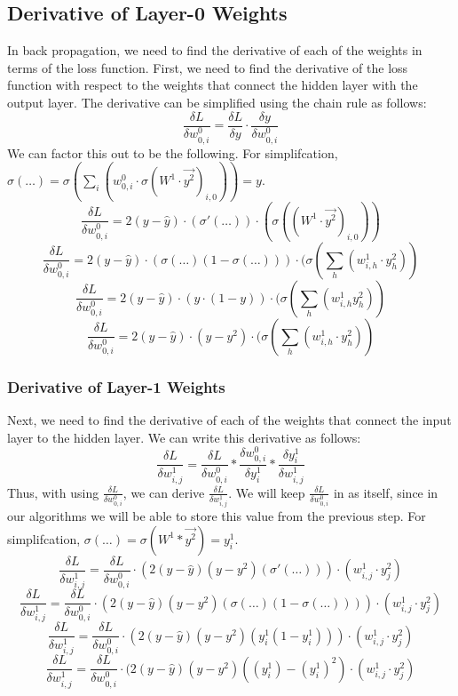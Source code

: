 \documentclass[10pt]{article}
\begin{document}
\subsection{Derivative of Layer-0 Weights}
In back propagation, we need to find the derivative of each of the weights in terms of the loss function. First, we need to find the derivative of the loss function with respect to the weights that connect the hidden layer with the output layer. The derivative can be simplified using the chain rule as follows:
$$\frac{\delta L}{\delta w^0_{0,i}} = \frac{\delta L}{\delta y} \cdot \frac{\delta y}{\delta w^0_{0,i}}$$
We can factor this out to be the following. 
\newline
For simplifcation, $\sigma(\ldots) = \sigma(\sum_i{(w^0_{0,i} \cdot \sigma(W^1 \cdot \vec{y^2})_{i,0})}) = y$.
$$\frac{\delta L}{\delta w^0_{0,i}} = 2(y - \hat{y}) \cdot (\sigma'(\ldots)) \cdot (\sigma((W^1 \cdot \vec{y^2})_{i,0}))$$
$$\frac{\delta L}{\delta w^0_{0,i}} = 2(y - \hat{y}) \cdot (\sigma(\ldots)(1 - \sigma(\ldots))) \cdot (\sigma(\sum_h{(w^1_{i,h} \cdot y^2_{h})})$$
$$\frac{\delta L}{\delta w^0_{0,i}} = 2(y - \hat{y}) \cdot (y \cdot (1 - y)) \cdot (\sigma(\sum_h{(w^1_{i,h} y^2_{h})})$$
$$\frac{\delta L}{\delta w^0_{0,i}} = 2(y - \hat{y}) \cdot (y - y^2) \cdot  (\sigma(\sum_h^{}{(w^1_{i,h} \cdot y^2_{h})})$$

\subsubsection{Derivative of Layer-1 Weights}
Next, we need to find the derivative of each of the weights that connect the input layer to the hidden layer. We can write this derivative as follows:
$$\frac{\delta L}{\delta w^1_{i,j}} = \frac{\delta L}{\delta w^0_{0,i}} * \frac{\delta w^0_{0,i}}{\delta y^1_i} * \frac{\delta y^1_i}{\delta w^1_{i,j}}$$
Thus, with using $\frac{\delta L}{\delta w^0_{0,i}}$, we can derive $\frac{\delta L}{\delta w^1_{i,j}}$. We will keep $\frac{\delta L}{\delta w^0_{0,i}}$ in as itself, since in our algorithms we will be able to store this value from the previous step.
\newline
For simplifcation, $\sigma(\ldots) = \sigma(W^1 * \vec{y^2}) = y^1_i$.
$$\frac{\delta L}{\delta w^1_{i,j}} = \frac{\delta L}{\delta w^0_{0,i}} \cdot (2(y-\hat{y})(y - y^2)(\sigma'(\ldots))) \cdot (w^1_{i,j} \cdot y^2_{j})$$
$$\frac{\delta L}{\delta w^1_{i,j}} = \frac{\delta L}{\delta w^0_{0,i} } \cdot (2(y - \hat{y})(y - y^2)(\sigma(\ldots)(1 - \sigma(\ldots)))) \cdot (w^1_{i,j} \cdot y^2_{j})$$
$$\frac{\delta L}{\delta w^1_{i,j}} = \frac{\delta L}{\delta w^0_{0,i}} \cdot (2(y - \hat{y})(y - y^2)(y^1_i (1 - y^1_i))) \cdot (w^1_{i,j} \cdot y^2_{j})$$
$$\frac{\delta L}{\delta w^1_{i,j}} = \frac{\delta L}{\delta w^0_{0,i}} \cdot (2(y - \hat{y})(y - y^2)((y^1_i) - (y^1_i)^2) \cdot (w^1_{i,j} \cdot y^2_{j})$$
\end{document}
